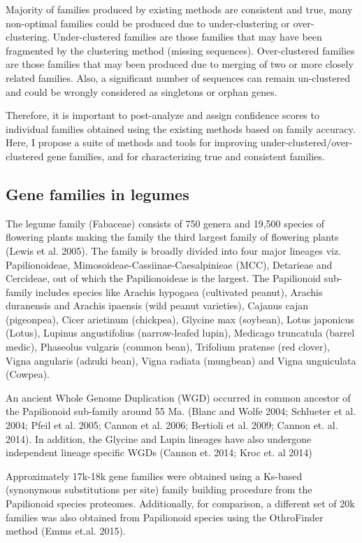 \documentclass{article}
\begin{document}
		 Majority of families produced by existing methods are consistent and true, many non-optimal families could be produced due to under-clustering or over-clustering. Under-clustered families are those families that may have been fragmented by the clustering method (missing sequences). Over-clustered families are those families that may been produced due to merging of two or more closely related families. Also, a significant number of sequences can remain un-clustered and could be wrongly considered as singletons or orphan genes. 
		
		Therefore, it is important to post-analyze and assign confidence scores to individual families obtained using the existing methods based on family accuracy. Here, I propose a suite of methods and tools for improving under-clustered/over-clustered gene families, and for characterizing true and consistent families.
		
		\subsection{Gene families in legumes}
		The legume family (Fabaceae) consists of 750 genera and 19,500 species of flowering plants making the family the third largest family of flowering plants (Lewis et al. 2005). The family is broadly divided into four major lineages viz. Papilionoideae, Mimosoideae-Cassiinae-Caesalpinieae (MCC), Detarieae and Cercideae, out of which the Papilionoideae is the largest. The Papilionoid sub-family includes species like Arachis hypogaea (cultivated peanut), Arachis duranensis and Arachis ipaensis (wild peanut varieties), Cajanus cajan (pigeonpea), Cicer arietinum (chickpea), Glycine max (soybean), Lotus japonicus (Lotus), Lupinus angustifolius (narrow-leafed lupin), Medicago truncatula (barrel medic), Phaseolus vulgaris (common bean), Trifolium pratense (red clover), Vigna angularis (adzuki bean), Vigna radiata (mungbean) and Vigna unguiculata (Cowpea).
		
		An ancient Whole Genome Duplication (WGD) occurred in common ancestor of the Papilionoid sub-family around 55 Ma. (Blanc and Wolfe 2004; Schlueter et al. 2004; Pfeil et al. 2005; Cannon et al. 2006; Bertioli et al. 2009; Cannon et. al. 2014). In addition, the Glycine and Lupin lineages have also undergone independent lineage specific WGDs (Cannon et. 2014; Kroc et. al 2014) 
		
		Approximately 17k-18k gene families were obtained using a Ks-based (synonymous substitutions per site) family building procedure from the Papilionoid species proteomes. Additionally, for comparison, a different set of 20k families was also obtained from Papilionoid species using the OthroFinder method (Emms et.al. 2015).
		\pagebreak
\end{document}
